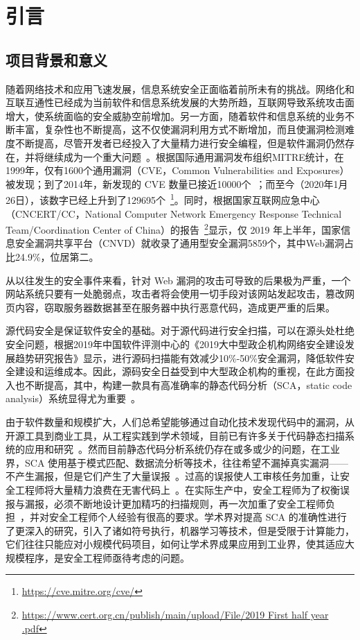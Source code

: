 \chapter{引言}

\section{项目背景和意义}
随着网络技术和应用飞速发展，信息系统安全正面临着前所未有的挑战。网络化和互联互通性已经成为当前软件和信息系统发展的大势所趋，互联网导致系统攻击面增大，使系统面临的安全威胁空前增加。另一方面，随着软件和信息系统的业务不断丰富，复杂性也不断提高，这不仅使漏洞利用方式不断增加，而且使漏洞检测难度不断提高，尽管开发者已经投入了大量精力进行安全编程，但是软件漏洞仍然存在，并将继续成为一个重大问题~\cite{vuldeepecker}。根据国际通用漏洞发布组织MITRE统计，在1999年，仅有1600个通用漏洞（CVE，Common Vulnerabilities and Exposures）被发现；到了2014年，新发现的 CVE 数量已接近10000个~\cite{liujian2018}；而至今（2020年1月26日），该数字已经上升到了129695个~\footnote{\url{https://cve.mitre.org/cve/}}。同时，根据国家互联网应急中心（CNCERT/CC，National Computer Network Emergency Response Technical Team/Coordination Center of China）的报告~\footnote{\url{https://www.cert.org.cn/publish/main/upload/File/2019 First half year .pdf}}显示，仅 2019 年上半年，国家信息安全漏洞共享平台（CNVD）就收录了通用型安全漏洞5859个，其中Web漏洞占比24.9\%，位居第二。

从以往发生的安全事件来看，针对 Web 漏洞的攻击可导致的后果极为严重，一个网站系统只要有一处脆弱点，攻击者将会使用一切手段对该网站发起攻击，篡改网页内容，窃取服务器数据甚至在服务器中执行恶意代码，造成更严重的后果。

源代码安全是保证软件安全的基础。对于源代码进行安全扫描，可以在源头处杜绝安全问题，根据2019年中国软件评测中心的《2019大中型政企机构网络安全建设发展趋势研究报告》显示，进行源码扫描能有效减少10\%-50\%安全漏洞，降低软件安全建设和运维成本。因此，源码安全日益受到中大型政企机构的重视，在此方面投入也不断提高，其中，构建一款具有高准确率的静态代码分析（SCA，static code analysis）系统显得尤为重要~\cite{aletheia}。

由于软件数量和规模扩大，人们总希望能够通过自动化技术发现代码中的漏洞，从开源工具到商业工具，从工程实践到学术领域，目前已有许多关于代码静态扫描系统的应用和研究~\cite{li2016vulpecker,leopard,sym:exe,taint:finding,vuldeepecker,taint:taj,Koc2019,sym:cute,atp:saturn,sym:klee,atp:escjava,Koc2017,pixy,aletheia}。然而目前静态代码分析系统仍存在或多或少的问题，在工业界，SCA 使用基于模式匹配、数据流分析等技术，往往希望不漏掉真实漏洞——不产生漏报，但是它们产生了大量误报~\cite{falseAlarm,aletheia,falsepositive}。过高的误报使人工审核任务加重，让安全工程师将大量精力浪费在无害代码上~\cite{leopard}。在实际生产中，安全工程师为了权衡误报与漏报，必须不断地设计更加精巧的扫描规则，再一次加重了安全工程师负担~\cite{taintStyle,vuldeepecker}，并对安全工程师个人经验有很高的要求。学术界对提高 SCA 的准确性进行了更深入的研究，引入了诸如符号执行，机器学习等技术，但是受限于计算能力，它们往往只能应对小规模代码项目，如何让学术界成果应用到工业界，使其适应大规模程序，是安全工程师亟待考虑的问题。

